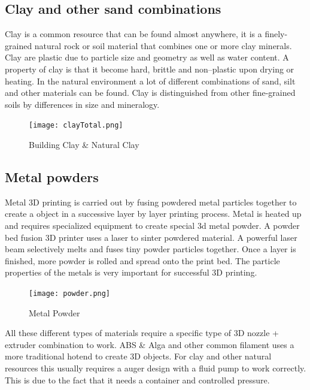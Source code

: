 \documentclass[11pt]{article}
\begin{document}
\newpage

\subsection{Clay and other  sand combinations}

	 Clay is a common resource that can be found almost anywhere, it is a finely-grained natural rock or soil material that combines one or more clay minerals. Clay are plastic due to particle size and geometry as well as water content. A property of clay is that it become hard, brittle and non–plastic upon drying or heating. In the natural environment a lot of different combinations of sand, silt and other materials can be found. Clay is distinguished from other fine-grained soils by differences in size and mineralogy.\\
	
	\begin{figure}[hbtp]
	\caption{Building Clay \& Natural Clay }
	\centering
	\texttt{[image: clayTotal.png]}
	\end{figure}

	
	\subsection{Metal powders}
		Metal 3D printing is carried out by fusing powdered metal particles together to create a object in a successive layer by layer printing process. Metal is heated up and requires specialized equipment to create special 3d metal powder. A powder bed fusion 3D printer uses a laser to sinter powdered material. A powerful laser beam selectively melts and fuses tiny powder particles together. Once a layer is finished, more powder is rolled and spread onto the print bed. The particle properties of the metals is very important for successful 3D printing.\\
		
		
\begin{figure}[hbtp]
\caption{Metal Powder}
\centering
\texttt{[image: powder.png]}
\end{figure}

\newpage


All these different types of materials require a specific type of 3D nozzle + extruder combination to work. ABS \& Alga and other common filament uses a more traditional hotend to create 3D objects.  For clay and other natural resources this usually  requires a auger design with a fluid pump to work correctly. This is due to the fact that it needs a container and controlled pressure.\\
\end{document}
